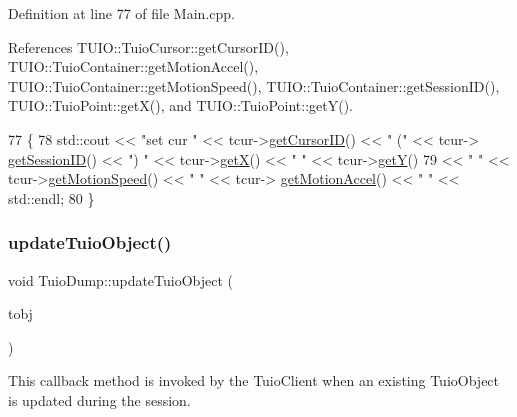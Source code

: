 Definition at line 77 of file Main.\+cpp.



References T\+U\+I\+O\+::\+Tuio\+Cursor\+::get\+Cursor\+I\+D(), T\+U\+I\+O\+::\+Tuio\+Container\+::get\+Motion\+Accel(), T\+U\+I\+O\+::\+Tuio\+Container\+::get\+Motion\+Speed(), T\+U\+I\+O\+::\+Tuio\+Container\+::get\+Session\+I\+D(), T\+U\+I\+O\+::\+Tuio\+Point\+::get\+X(), and T\+U\+I\+O\+::\+Tuio\+Point\+::get\+Y().


\begin{DoxyCode}
77                                                 \{
78     std::cout << \textcolor{stringliteral}{"set cur "} << tcur->\hyperlink{class_t_u_i_o_1_1_tuio_cursor_a3e8ee1381e61eb54c7563e10a2fafb0b}{getCursorID}() << \textcolor{stringliteral}{" ("} <<  tcur->
      \hyperlink{class_t_u_i_o_1_1_tuio_container_a84c29bb63b233dbfd22811dab5b62833}{getSessionID}() << \textcolor{stringliteral}{") "} << tcur->\hyperlink{class_t_u_i_o_1_1_tuio_point_ad5bb767c0a7b151704b59a38793345f0}{getX}() << \textcolor{stringliteral}{" "} << tcur->\hyperlink{class_t_u_i_o_1_1_tuio_point_a6c591de33c3c0f0d5e8df159ce643b7a}{getY}() 
79                 << \textcolor{stringliteral}{" "} << tcur->\hyperlink{class_t_u_i_o_1_1_tuio_container_ad8c0682163804a1f7e7e908d10272e20}{getMotionSpeed}() << \textcolor{stringliteral}{" "} << tcur->
      \hyperlink{class_t_u_i_o_1_1_tuio_container_ac2a47a96b789844909b2fffd17a63f36}{getMotionAccel}() << \textcolor{stringliteral}{" "} << std::endl;
80 \}
\end{DoxyCode}
\mbox{\label{class_tuio_dump_a0bade2cba83fe3dcdb11ca475e2f4862}} 
\subsubsection{\texorpdfstring{update\+Tuio\+Object()}{updateTuioObject()}}
{\footnotesize\ttfamily void Tuio\+Dump\+::update\+Tuio\+Object (\begin{DoxyParamCaption}\item[{\hyperlink{class_t_u_i_o_1_1_tuio_object}{Tuio\+Object} $\ast$}]{tobj }\end{DoxyParamCaption})\hspace{0.3cm}{\ttfamily [virtual]}}

This callback method is invoked by the Tuio\+Client when an existing Tuio\+Object is updated during the session.


